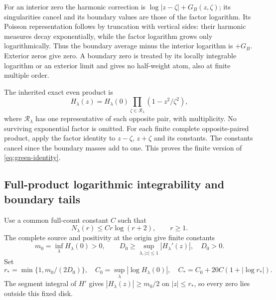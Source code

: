 For an interior zero the harmonic correction is
\(\log|z-\zeta|+G_B(z,\zeta)\); its singularities cancel and its
boundary values are those of the factor logarithm. Its Poisson
representation follows by truncation with vertical sides: their harmonic
measures decay exponentially, while the factor logarithm grows only
logarithmically. Thus the boundary average minus the interior logarithm
is \(+G_B\). Exterior zeros give zero. A boundary zero is treated by its
locally integrable logarithm or an exterior limit and gives no half-weight
atom, also at finite multiple order.

The inherited exact even product is
\begin{equation}\label{eq:green-product}
 H_\lambda(z)=H_\lambda(0)
      \prod_{\zeta\in\mathcal R_\lambda}(1-z^2/\zeta^2),
\end{equation}
where \(\mathcal R_\lambda\) has one representative of each opposite
pair, with multiplicity. No surviving exponential factor is omitted.
For each finite complete opposite-paired product, apply the factor
identity to \(z-\zeta\), \(z+\zeta\) and its constants. The constants
cancel since the boundary masses add to one. This proves the finite
version of \eqref{eq:green-identity}.

\subsection{Full-product logarithmic integrability and boundary tails}
Use a common full-count constant \(C\) such that
\begin{equation}\label{eq:green-full-count}
 N_\lambda(r)\le Cr\log(r+2),\qquad r\ge1.
\end{equation}
The complete source and positivity at the origin give finite constants
\[
 m_0=\inf_\lambda H_\lambda(0)>0,\qquad
 D_0\ge\sup_{\lambda,|z|\le1}|H_\lambda'(z)|,\quad D_0>0.
\]
Set
\begin{equation}\label{eq:green-log-constants}
 r_*=\min\{1,m_0/(2D_0)\},\quad C_0=\sup_\lambda|\log H_\lambda(0)|,
 \quad C_*=C_0+20C(1+|\log r_*|).
\end{equation}
The segment integral of \(H'\) gives \(|H_\lambda(z)|\ge m_0/2\)
on \(|z|\le r_*\), so every zero lies outside this fixed disk.

